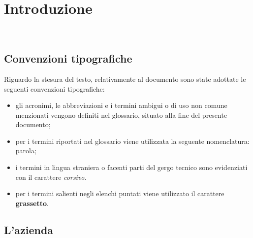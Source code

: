 \chapter{Introduzione}
\label{cap:introduzione}

\\





\section{Convenzioni tipografiche}
\label{sec:convenzioni-tipografiche}

Riguardo la stesura del testo, relativamente al documento sono state adottate le seguenti convenzioni tipografiche:
\begin{itemize}
	\item gli acronimi, le abbreviazioni e i termini ambigui o di uso non comune menzionati vengono definiti nel glossario, situato alla fine del presente documento;
	\item per i termini riportati nel glossario viene utilizzata la seguente nomenclatura: parola\glsoccur;
	\item i termini in lingua straniera o facenti parti del gergo tecnico sono evidenziati con il carattere \emph{corsivo}.
	\item per i termini salienti negli elenchi puntati viene utilizzato il carattere \textbf{grassetto}.
\end{itemize}

\section{L'azienda}
\label{sec:azienda}

